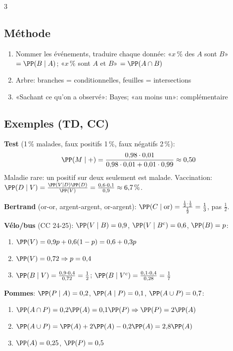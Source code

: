 \documentclass[12pt, a4paper]{article}
\begin{document}
\begin{multicols*}{3}
	\subsection{Méthode}
	\begin{enumerate}[\roman*.]
		\item Nommer les événements, traduire chaque donnée: «$x\,\%$ des $A$ sont $B$» $=\PP(B\mid A)$; «$x\,\%$ sont $A$ et $B$» $=\PP(A\cap B)$
		\item Arbre: branches = conditionnelles, feuilles = intersections
		\item «Sachant ce qu'on a observé»: Bayes; «au moins un»: complémentaire
	\end{enumerate}

	\colbreak
	\subsection{Exemples (TD, CC)}
	\textbf{Test} (1\,\% malades, faux positifs 1\,\%, faux négatifs 2\,\%):
	\begin{gather*}
		\PP(M\mid +)=\frac{0{,}98\cdot0{,}01}{0{,}98\cdot0{,}01+0{,}01\cdot0{,}99}\approx0{,}50
	\end{gather*}
	Maladie rare: un positif sur deux seulement est malade. Vaccination: $\PP(D\mid V)=\frac{\PP(V\mid D)\PP(D)}{\PP(V)}=\frac{0{,}6\cdot0{,}1}{0{,}9}\approx6{,}7\,\%$.

	\textbf{Bertrand} (or-or, argent-argent, or-argent): $\PP(C\mid\text{or})=\frac{\frac12\cdot\frac13}{\frac12}=\frac13$, pas $\frac12$.

	\textbf{Vélo/bus} (CC 24-25): $\PP(V\mid B)=0{,}9$, $\PP(V\mid B^c)=0{,}6$, $\PP(B)=p$:
	\begin{enumerate}[\roman*.]
		\item $\PP(V)=0{,}9p+0{,}6(1-p)=0{,}6+0{,}3p$
		\item $\PP(V)=0{,}72\Rightarrow p=0{,}4$
		\item $\PP(B\mid V)=\frac{0{,}9\cdot0{,}4}{0{,}72}=\frac12$; $\PP(B\mid V^c)=\frac{0{,}1\cdot0{,}4}{0{,}28}=\frac17$
	\end{enumerate}

	\textbf{Pommes}: $\PP(P\mid A)=0{,}2$, $\PP(A\mid P)=0{,}1$, $\PP(A\cup P)=0{,}7$:
	\begin{enumerate}[\roman*.]
		\item $\PP(A\cap P)=0{,}2\PP(A)=0{,}1\PP(P)\Rightarrow\PP(P)=2\PP(A)$
		\item $\PP(A\cup P)=\PP(A)+2\PP(A)-0{,}2\PP(A)=2{,}8\PP(A)$
		\item $\PP(A)=0{,}25$, $\PP(P)=0{,}5$
	\end{enumerate}


\end{multicols*}
\end{document}
